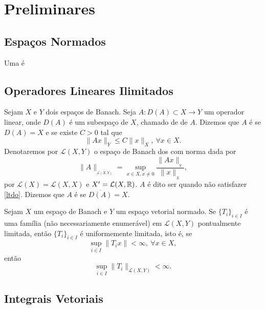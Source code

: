 \chapter{Preliminares}
\section{Espaços Normados}

\begin{definition}
    Uma  é  
\end{definition}


\section{Operadores Lineares Ilimitados}

Sejam $X$ e $Y$ dois espaços de Banach. Seja $A:D(A)\subset X\longrightarrow Y$ um operador linear,  onde $D(A)$ é um subespaço de $X$, chamado de  de $A$.
\medskip
Dizemos que $A$ é   se $D(A)=X$ e se existe  $C>0$ tal que 
\begin{equation}\label{ltdo}
\|Ax\|_{Y}\leq C\|x\|_X, \ \forall x\in X.
\end{equation}
Denotaremos por $\mathcal{L}(X,Y)$ o espaço de Banach dos  com norma dada por
\[\|A\|_{_{\mathcal{L}(X,Y)}}=\sup\limits_{x\in X, x\neq 0}\frac{\|Ax\|_{_Y}}{\|x\|_{_X}},\]
por $\mathcal{L}(X)=\mathcal{L}(X,X)$ e $X'=\mathcal{L}(X,\mathbb{R})$.
$A$ é dito ser   quando não satisfazer \eqref{ltdo}. Dizemos que $A$ é   se $\overline{D(A)}=X$.

\begin{theorem}\label{th-BS}
	Sejam $X$ um espaço de Banach e $Y$ um espaço vetorial normado. Se $\{T_i\}_{i\in I}$  é uma família (não necessariamente enumerável) em $\mathcal{L}(X,Y)$ pontualmente limitada, então $\{T_i\}_{i\in I}$ é uniformemente limitada, isto é, se 
	 \[\sup_{i\in I}\|T_ix\|< \infty,\ \forall x\in X,\] 
	 então
	 \[\sup_{i\in I}\|T_i\|_{\mathcal{L}(X,Y)}<\infty.\]
\end{theorem}

\section{Integrais Vetoriais}

